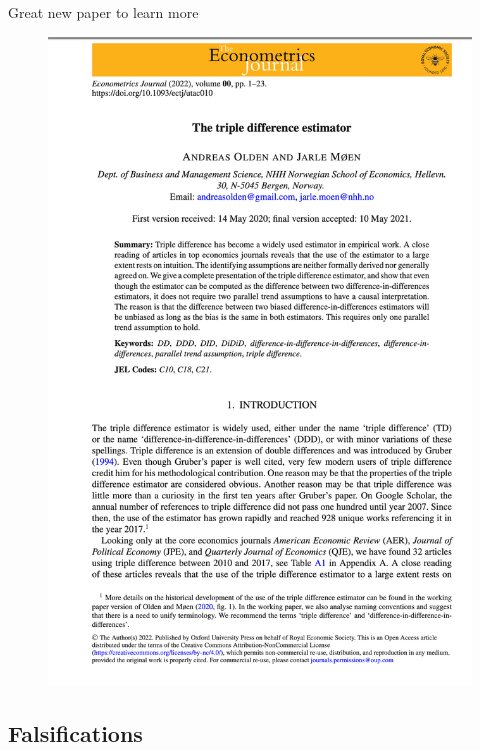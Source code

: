 \documentclass{beamer}
\begin{document}
\begin{frame}{Great new paper to learn more}

\begin{figure}
\includegraphics[scale=0.25]{./lecture_includes/olden_moen_2022_ddd.png}
\end{figure}

\end{frame}



\subsection{Falsifications}
\end{document}
